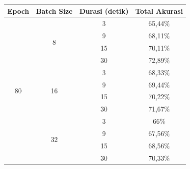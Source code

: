 \begin{longtable}[Hc]{|c|c|c|c|}
	\hline
	\multicolumn{1}{|l|}{\textbf{Epoch}} & \multicolumn{1}{l|}{\textbf{Batch Size}} & \multicolumn{1}{l|}{\textbf{Durasi (detik)}} & \multicolumn{1}{l|}{\textbf{Total Akurasi}} \\ \hline
	\endfirsthead
	\endhead
	\multirow{12}{*}{80}                 & \multirow{4}{*}{8}                       & 3                                            & 65,44\%                                     \\ \cline{3-4} 
	&                                          & 9                                            & 68,11\%                                     \\ \cline{3-4} 
	&                                          & 15                                           & 70,11\%                                     \\ \cline{3-4} 
	&                                          & 30                                           & 72,89\%                                     \\ \cline{2-4} 
	& \multirow{4}{*}{16}                      & 3                                            & 68,33\%                                     \\ \cline{3-4} 
	&                                          & 9                                            & 69,44\%                                     \\ \cline{3-4} 
	&                                          & 15                                           & 70,22\%                                     \\ \cline{3-4} 
	&                                          & 30                                           & 71,67\%                                     \\ \cline{2-4} 
	& \multirow{4}{*}{32}                      & 3                                            & 66\%                                     \\ \cline{3-4} 
	&                                          & 9                                            & 67,56\%                                     \\ \cline{3-4} 
	&                                          & 15                                           & 68,56\%                                     \\ \cline{3-4} 
	&                                          & 30                                           & 70,33\%                                     \\ \hline

\end{longtable}
